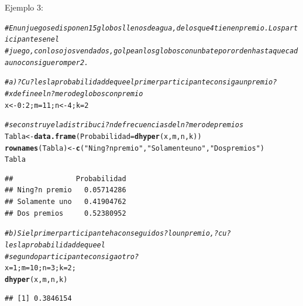 \documentclass[10pt,a4paper]{article}\usepackage[]{graphicx}\usepackage[]{color}
\makeatletter
\newcommand{\hlnum}[1]{\textcolor[rgb]{0.686,0.059,0.569}{#1}}%
\newcommand{\hlstr}[1]{\textcolor[rgb]{0.192,0.494,0.8}{#1}}%
\newcommand{\hlcom}[1]{\textcolor[rgb]{0.678,0.584,0.686}{\textit{#1}}}%
\newcommand{\hlopt}[1]{\textcolor[rgb]{0,0,0}{#1}}%
\newcommand{\hlstd}[1]{\textcolor[rgb]{0.345,0.345,0.345}{#1}}%
\newcommand{\hlkwb}[1]{\textcolor[rgb]{0.69,0.353,0.396}{#1}}%
\newcommand{\hlkwc}[1]{\textcolor[rgb]{0.333,0.667,0.333}{#1}}%
\newcommand{\hlkwd}[1]{\textcolor[rgb]{0.737,0.353,0.396}{\textbf{#1}}}%
\newenvironment{kframe}{%
 \def\at@end@of@kframe{}%
 \ifinner\ifhmode%
  \def\at@end@of@kframe{\end{minipage}}%
  \begin{minipage}{\columnwidth}%
 \fi\fi%
 \def\FrameCommand##1{\hskip\@totalleftmargin \hskip-\fboxsep
 \colorbox{shadecolor}{##1}\hskip-\fboxsep
     \hskip-\linewidth \hskip-\@totalleftmargin \hskip\columnwidth}%
 \MakeFramed {\advance\hsize-\width
   \@totalleftmargin\z@ \linewidth\hsize
   \@setminipage}}%
 {\par\unskip\endMakeFramed%
 \at@end@of@kframe}
\newenvironment{knitrout}{}{} %
\makeatother
\begin{document}
Ejemplo 3: 
\begin{knitrout}
\color{fgcolor}\begin{kframe}
\begin{alltt}
\hlcom{#En un juego se disponen 15 globos llenos de agua, delos que 4 tienen premio. Los participantes en el }
\hlcom{#juego, con los ojos vendados, golpean los globos con un bate por orden hasta que cada uno consigue romper2.}

\hlcom{#a) ?Cu?l es la probabilidad de que elprimer participante consiga un premio?}
\hlcom{# x define el n?mero de globos con premio}
\hlstd{x} \hlkwb{<-} \hlnum{0}\hlopt{:}\hlnum{2}\hlstd{; m} \hlkwb{=} \hlnum{11}\hlstd{; n} \hlkwb{<-} \hlnum{4}\hlstd{; k}\hlkwb{=}\hlnum{2}

\hlcom{# se construye la distribuci?n de frecuencias del n?mero de premios }
\hlstd{Tabla} \hlkwb{<-} \hlkwd{data.frame}\hlstd{(}\hlkwc{Probabilidad}\hlstd{=}\hlkwd{dhyper}\hlstd{(x, m, n, k))}
\hlkwd{rownames}\hlstd{(Tabla)} \hlkwb{<-} \hlkwd{c}\hlstd{(}\hlstr{"Ning?n premio"}\hlstd{,}\hlstr{"Solamente uno"}\hlstd{,} \hlstr{"Dos premios"}\hlstd{)}
\hlstd{Tabla}
\end{alltt}
\begin{verbatim}
##               Probabilidad
## Ning?n premio   0.05714286
## Solamente uno   0.41904762
## Dos premios     0.52380952
\end{verbatim}
\begin{alltt}
\hlcom{#b) Si el primer participante ha conseguido s?lo un premio, ?cu?l es la probabilidad de que el }
\hlcom{#segundo participante consiga otro?}
\hlstd{x} \hlkwb{=} \hlnum{1}\hlstd{; m}\hlkwb{=} \hlnum{10}\hlstd{; n}\hlkwb{=} \hlnum{3}\hlstd{; k}\hlkwb{=} \hlnum{2}\hlstd{;}
\hlkwd{dhyper}\hlstd{(x, m, n, k)}
\end{alltt}
\begin{verbatim}
## [1] 0.3846154
\end{verbatim}
\end{kframe}
\end{knitrout}
\end{document}
